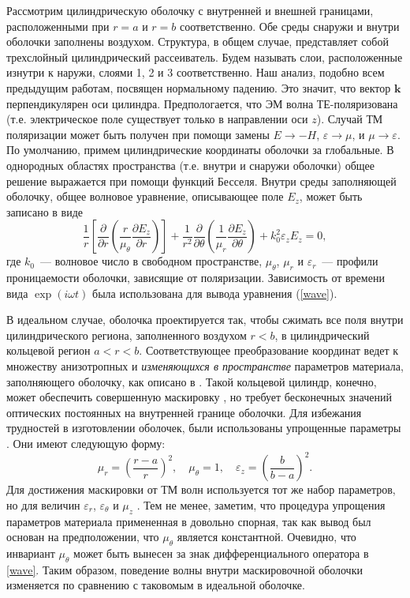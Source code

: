 \documentclass[12pt]{article}
\begin{document}
Рассмотрим цилиндрическую оболочку с внутренней и внешней границами,
расположенными при $r = a$ и $r = b$ соответственно. Обе среды снаружи
и внутри оболочки заполнены воздухом. Структура, в общем случае,
представляет собой трехслойный цилиндрический рассеиватель. Будем
называть слои, расположенные изнутри к наружи, слоями 1, 2 и 3
соответственно. Наш анализ, подобно всем предыдущим работам, посвящен
нормальному падению. Это значит, что вектор $\mathbf k$
перпендикулярен оси цилиндра. Предпологается, что ЭМ волна
ТЕ-поляризована (т.е. электрическое поле существует только в
направлении оси $z$). Случай ТМ поляризации может быть получен при
помощи замены $E \to -H$, $\varepsilon \to \mu$, и $\mu \to
\varepsilon$. По умолчанию, примем цилиндрические координаты оболочки
за глобальные. В однородных областях пространства (т.е. внутри и
снаружи оболочки) общее решение выражается при помощи функций
Бесселя. Внутри среды заполняющей оболочку, общее волновое уравнение,
описывающее поле $E_z$, может быть записано в виде
\begin{equation}\label{wave}
  \frac{1}{r} \left[\frac{\partial}{\partial r}
    \left(\frac{r}{\mu_\theta} \frac{\partial E_z}{\partial r}
    \right)\right]
  + \frac{1}{r^2} \frac{\partial}{\partial \theta}
  \left(\frac{1}{\mu_r} \frac{\partial E_z}{\partial \theta}\right)
  + k_0^2 \varepsilon_z E_z = 0,
\end{equation}
где $k_0$~--- волновое число в свободном пространстве, $\mu_\theta$, $\mu_r$ и
$\varepsilon_r$~--- профили проницаемости
оболочки, зависящие от поляризации. Зависимость от времени вида $\exp(i
\omega t)$ была использована для вывода уравнения (\ref{wave}).

В идеальном случае, оболочка проектируется так, чтобы сжимать все поля
внутри цилиндрического региона, заполненного воздухом $r < b$, в
цилиндрический кольцевой регион $a < r < b$. Соответствующее
преобразование координат ведет к множеству анизотропных и {\it
изменяющихся в пространстве} параметров материала, заполняющего
оболочку, как описано в \cite{9}. Такой кольцевой цилиндр, конечно,
может обеспечить совершенную маскировку \cite{11}, но требует
бесконечных значений оптических постоянных на внутренней границе
оболочки. Для избежания трудностей в изготовлении оболочек, были использованы
упрощенные параметры \cite{9}. Они имеют следующую форму:
\begin{equation}\label{material}
  \mu_r = \left(\frac{r - a}{r}\right)^2, \quad
  \mu_\theta = 1, \quad
  \varepsilon_z = \left(\frac{b}{b - a}\right)^2.
\end{equation}
Для достижения маскировки от ТМ волн используется тот же набор
параметров, но для величин $\varepsilon_r$, $\varepsilon_\theta$ и
$\mu_z$ \cite{10}. Тем не менее, заметим, что процедура упрощения
параметров материала примененная в \cite{9} довольно спорная, так как
вывод был основан на предположении, что $\mu_\theta$ является
константной. Очевидно, что инвариант $\mu_\theta$ может быть вынесен за
знак дифференциального оператора в \eqref{wave}. Таким образом,
поведение волны внутри маскировочной оболочки изменяется по сравнению с
таковомым в идеальной оболочке.
\end{document}
